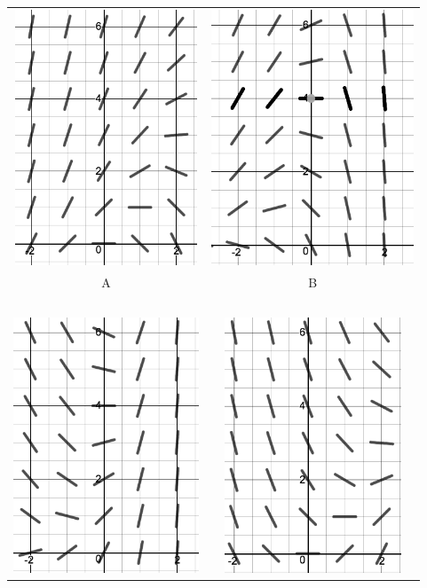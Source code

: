 \documentclass[addpoints,12pt]{exam}
\begin{document}
\begin{questions}
\begin{parts}
\begin{tabular}{c|c} \includegraphics[height=3in]{sf3} & 
 \includegraphics[height=3in]{sf1}\\
 A & B \\
 \hline
 ~\\
 \includegraphics[height=3in]{sf2}&
 \includegraphics[height=3in]{sf4}\\

\end{tabular}
\end{parts}
\end{questions}
\end{document}
